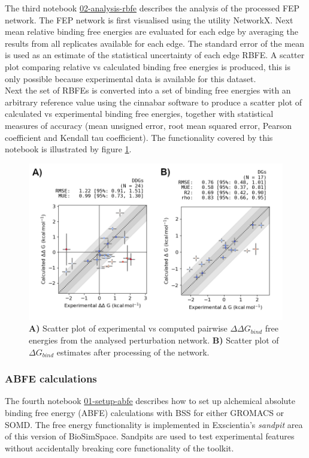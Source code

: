 The third notebook \href{https://github.com/OpenBioSim/BioSimSpaceTutorials/blob/main/04_fep/02_RBFE/02_analysis_rbfe.ipynb}{02-analysis-rbfe} describes the analysis of the processed FEP network. 
The FEP network is first visualised using the utility NetworkX. Next mean relative binding free energies are evaluated for each edge by averaging the results from all replicates available for each edge. The standard error of the mean is used as an estimate of the statistical uncertainty of each edge RBFE. 
A scatter plot comparing relative vs calculated binding free energies is produced, this is only possible because experimental data is available for this dataset. 
\\
Next the set of RBFEs is converted into  a set of binding free energies with an arbitrary reference value using the cinnabar software to produce a scatter plot of calculated vs experimental binding free energies, together with statistical measures of accuracy (mean unsigned error, root mean squared error, Pearson coefficient and Kendall tau coefficient). The functionality covered by this notebook is illustrated by figure \ref{rbfe_analysis_fig}.
\\

\begin{figure}[htp]
\includegraphics[width=\linewidth]{LIVECOMS/04_fep/rbfe-analysis.png}
\caption{ \textbf{A)} Scatter plot of experimental vs computed pairwise $\Delta \Delta G_{bind}$ free energies from the analysed perturbation network. \textbf{B)} Scatter plot of $\Delta G_{bind}$ estimates after processing of the network. } 
\label{rbfe_analysis_fig}
\end{figure}

\subsubsection{ABFE calculations}
%
The fourth notebook \href{https://github.com/OpenBioSim/BioSimSpaceTutorials/blob/main/04_fep/03_ABFE/01_setup_abfe.ipynb}{01-setup-abfe} describes how to set up alchemical absolute binding free energy (ABFE) calculations with BSS for either GROMACS or SOMD. The free energy functionality is implemented in Exscientia's \textit{sandpit} area of this version of BioSimSpace. Sandpits are used to test experimental features without accidentally breaking core functionality of the toolkit. 

